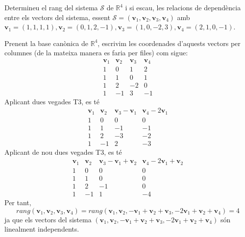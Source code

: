 \begin{exercici}
Determineu el rang del sistema $\mathcal{S}$ de $\mathbb{R}^{4}$ i
si escau, les relacions de dependència entre els vectors del sistema,
essent $\mathcal{S}=(\mathbf{v}_{1},\mathbf{v}_{2},\mathbf{v}_{3},\mathbf{v}%
_{4})$ amb $\mathbf{v}_{1}=(1,1,1,1),\mathbf{v}_{2}=(0,1,2,-1),\mathbf{v}%
_{3}=(1,0,-2,3),\mathbf{v}_{4}=(2,1,0,-1)$.

\end{exercici}
\begin{solucio}
Prenent la base canònica de $\mathbb{R}^{4}$, escrivim les coordenades
d’aquests vectors per columnes (de la mateixa manera es faria per files) com
sigue:%
\begin{equation*}
\begin{array}{rrrr}
\mathbf{v}_{1} & \mathbf{v}_{2} & \mathbf{v}_{3} & \mathbf{v}_{4} \\
1 & 0 & 1 & 2 \\
1 & 1 & 0 & 1 \\
1 & 2 & -2 & 0 \\
1 & -1 & 3 & -1%
\end{array}%
\end{equation*}%
Aplicant dues vegades T3, es té%
\begin{equation*}
\begin{array}{rrrr}
\mathbf{v}_{1} & \mathbf{v}_{2} & \mathbf{v}_{3}-\mathbf{v}_{1} & \mathbf{v}%
_{4}-2\mathbf{v}_{1} \\
1 & 0 & 0 & 0 \\
1 & 1 & -1 & -1 \\
1 & 2 & -3 & -2 \\
1 & -1 & 2 & -3%
\end{array}%
\end{equation*}%
Aplicant de nou dues vegades T3, es té%
\begin{equation*}
\begin{array}{rrrr}
\mathbf{v}_{1} & \mathbf{v}_{2} & \mathbf{v}_{3}-\mathbf{v}_{1}+\mathbf{v}%
_{2} & \mathbf{v}_{4}-2\mathbf{v}_{1}+\mathbf{v}_{2} \\
1 & 0 & 0 & 0 \\
1 & 1 & 0 & 0 \\
1 & 2 & -1 & 0 \\
1 & -1 & 1 & -4%
\end{array}%
\end{equation*}%
Per tant,%
\begin{equation*}
rang(\mathbf{v}_{1},\mathbf{v}_{2},\mathbf{v}_{3},\mathbf{v}_{4})=rang(%
\mathbf{v}_{1},\mathbf{v}_{2},-\mathbf{v}_{1}+\mathbf{v}_{2}+\mathbf{v}%
_{3},-2\mathbf{v}_{1}+\mathbf{v}_{2}+\mathbf{v}_{4})=4
\end{equation*}%
ja que els vectors del sistema $(\mathbf{v}_{1},\mathbf{v}_{2},-\mathbf{v}%
_{1}+\mathbf{v}_{2}+\mathbf{v}_{3},-2\mathbf{v}_{1}+\mathbf{v}_{2}+\mathbf{v}%
_{4})$ són linealment independents.
\end{solucio}

